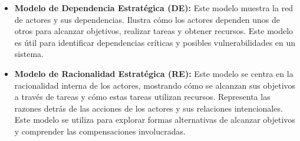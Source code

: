 \begin{itemize}
    \item \textbf{Modelo de Dependencia Estratégica (DE):}
    Este modelo muestra la red de actores y sus dependencias.
    Ilustra cómo los actores dependen unos de otros para alcanzar objetivos, realizar tareas y obtener recursos.
    Este modelo es útil para identificar dependencias críticas y posibles vulnerabilidades en un sistema.
    \item \textbf{Modelo de Racionalidad Estratégica (RE):}
    Este modelo se centra en la racionalidad interna de los actores, mostrando cómo se alcanzan sus objetivos a través de tareas y cómo estas tareas utilizan recursos.
    Representa las razones detrás de las acciones de los actores y sus relaciones intencionales.
    Este modelo se utiliza para explorar formas alternativas de alcanzar objetivos y comprender las compensaciones involucradas.
\end{itemize}
